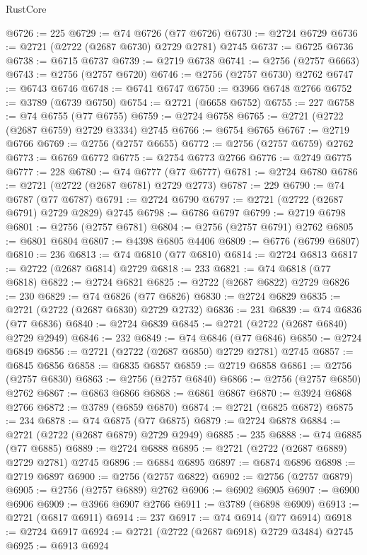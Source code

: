 \begin{lexlean}{RustCore}
\begin{coremodule}
@6726 := 225
@6729 := @74 @6726 (@77 @6726)
@6730 := @2724 @6729
@6736 := @2721 (@2722 (@2687 @6730) @2729 @2781) @2745
@6737 := @6725 @6736
@6738 := @6715 @6737
@6739 := @2719 @6738
@6741 := @2756 (@2757 @6663)
@6743 := @2756 (@2757 @6720)
@6746 := @2756 (@2757 @6730) @2762
@6747 := @6743 @6746
@6748 := @6741 @6747
@6750 := @3966 @6748 @2766
@6752 := @3789 (@6739 @6750)
@6754 := @2721 (@6658 @6752)
@6755 := 227
@6758 := @74 @6755 (@77 @6755)
@6759 := @2724 @6758
@6765 := @2721 (@2722 (@2687 @6759) @2729 @3334) @2745
@6766 := @6754 @6765
@6767 := @2719 @6766
@6769 := @2756 (@2757 @6655)
@6772 := @2756 (@2757 @6759) @2762
@6773 := @6769 @6772
@6775 := @2754 @6773 @2766
@6776 := @2749 @6775
@6777 := 228
@6780 := @74 @6777 (@77 @6777)
@6781 := @2724 @6780
@6786 := @2721 (@2722 (@2687 @6781) @2729 @2773)
@6787 := 229
@6790 := @74 @6787 (@77 @6787)
@6791 := @2724 @6790
@6797 := @2721 (@2722 (@2687 @6791) @2729 @2829) @2745
@6798 := @6786 @6797
@6799 := @2719 @6798
@6801 := @2756 (@2757 @6781)
@6804 := @2756 (@2757 @6791) @2762
@6805 := @6801 @6804
@6807 := @4398 @6805 @4406
@6809 := @6776 (@6799 @6807)
@6810 := 236
@6813 := @74 @6810 (@77 @6810)
@6814 := @2724 @6813
@6817 := @2722 (@2687 @6814) @2729
@6818 := 233
@6821 := @74 @6818 (@77 @6818)
@6822 := @2724 @6821
@6825 := @2722 (@2687 @6822) @2729
@6826 := 230
@6829 := @74 @6826 (@77 @6826)
@6830 := @2724 @6829
@6835 := @2721 (@2722 (@2687 @6830) @2729 @2732)
@6836 := 231
@6839 := @74 @6836 (@77 @6836)
@6840 := @2724 @6839
@6845 := @2721 (@2722 (@2687 @6840) @2729 @2949)
@6846 := 232
@6849 := @74 @6846 (@77 @6846)
@6850 := @2724 @6849
@6856 := @2721 (@2722 (@2687 @6850) @2729 @2781) @2745
@6857 := @6845 @6856
@6858 := @6835 @6857
@6859 := @2719 @6858
@6861 := @2756 (@2757 @6830)
@6863 := @2756 (@2757 @6840)
@6866 := @2756 (@2757 @6850) @2762
@6867 := @6863 @6866
@6868 := @6861 @6867
@6870 := @3924 @6868 @2766
@6872 := @3789 (@6859 @6870)
@6874 := @2721 (@6825 @6872)
@6875 := 234
@6878 := @74 @6875 (@77 @6875)
@6879 := @2724 @6878
@6884 := @2721 (@2722 (@2687 @6879) @2729 @2949)
@6885 := 235
@6888 := @74 @6885 (@77 @6885)
@6889 := @2724 @6888
@6895 := @2721 (@2722 (@2687 @6889) @2729 @2781) @2745
@6896 := @6884 @6895
@6897 := @6874 @6896
@6898 := @2719 @6897
@6900 := @2756 (@2757 @6822)
@6902 := @2756 (@2757 @6879)
@6905 := @2756 (@2757 @6889) @2762
@6906 := @6902 @6905
@6907 := @6900 @6906
@6909 := @3966 @6907 @2766
@6911 := @3789 (@6898 @6909)
@6913 := @2721 (@6817 @6911)
@6914 := 237
@6917 := @74 @6914 (@77 @6914)
@6918 := @2724 @6917
@6924 := @2721 (@2722 (@2687 @6918) @2729 @3484) @2745
@6925 := @6913 @6924

\end{coremodule}
\end{lexlean}
